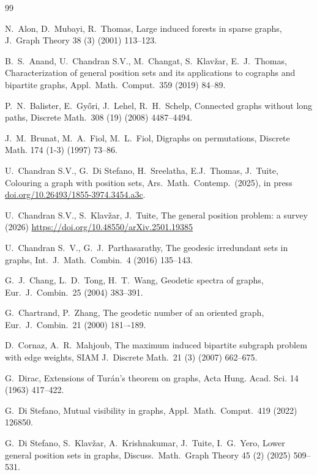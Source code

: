 \documentclass[a4paper,12pt]{article}
\theoremstyle{definition}
\begin{document}
	\begin{thebibliography}{99}
		
		
		N.~Alon, D.~Mubayi, R.~Thomas, Large induced forests in sparse graphs, J.\ Graph Theory 38 (3) (2001) 113--123.
		
		B.~S.~Anand, U.~Chandran S.V., M.~Changat, S.~Klav\v{z}ar, E.~J.~Thomas,
		Characterization of general position sets and its applications to cographs and bipartite graphs,
		Appl.\ Math.\ Comput.\ 359 (2019) 84--89.
		
		P.~N.~Balister, E.~Gy\H{o}ri, J.~Lehel, R.~H.~Schelp,
		Connected graphs without long paths, 
		Discrete Math.\ 308 (19) (2008) 4487--4494.
		
		J.~M.~Brunat, M.~A.~Fiol, M.~L.~Fiol,
		Digraphs on permutations,
		Discrete Math. 174 (1-3) (1997) 73--86.
		
		U.~Chandran S.V., G.~Di Stefano, H.~Sreelatha, E.J.~Thomas, J.~Tuite, 
		Colouring a graph with position sets, 
		Ars.\ Math.\ Contemp.\ (2025), in press \url{doi.org/10.26493/1855-3974.3454.a3c}. 
		
		U.~Chandran S.V., S.~Klav\v{z}ar, J.~Tuite, 
		The general position problem: a survey (2026) 
		\url{https://doi.org/10.48550/arXiv.2501.19385}
		
		U.~Chandran S.~V., G.~J.~Parthasarathy, 
		The geodesic irredundant sets in graphs, 
		Int.\ J.\ Math.\ Combin.\ 4 (2016) 135--143.
		
		G.~J.~Chang, L.~D.~Tong, H.~T.~Wang, Geodetic spectra of graphs, Eur.\ J.\ Combin.\ 25 (2004) 383--391.
		
		G.~Chartrand, P.~Zhang, 
		The geodetic number of an oriented graph, 
		Eur.\ J.\ Combin.\ 21 (2000) 181–-189.
		
		D.~Cornaz, A.~R.~Mahjoub,
		The maximum induced bipartite subgraph problem with edge weights,
		SIAM J.\ Discrete Math.\ 21 (3) (2007) 662--675.
		
		G.~Dirac, 
		Extensions of Tur\'{a}n’s theorem on graphs,
		Acta Hung. Acad. Sci. 14 (1963) 417--422.
		
		
		G.~Di Stefano, 
		Mutual visibility in graphs, 
		Appl.\ Math.\ Comput.\ 419 (2022) 126850.
		
		G.~{Di Stefano}, S.~Klav\v{z}ar, A.~Krishnakumar, J.~Tuite, I.~G.~Yero,
		Lower general position sets in graphs,
		Discuss.\ Math.\ Graph Theory 45 (2) (2025) 509--531.
		

\end{thebibliography}
\end{document}
